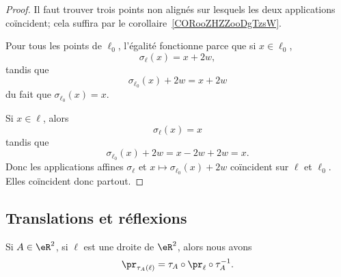 \begin{proof}
    Il faut trouver trois points non alignés sur lesquels les deux applications coïncident; cela suffira par le corollaire~\ref{CORooZHZZooDgTzsW}.

    Pour tous les points de \( \ell_0\), l'égalité fonctionne parce que si \( x\in\ell_0\),
    \begin{equation}
        \sigma_{\ell}(x)=x+2w,
    \end{equation}
    tandis que
    \begin{equation}
        \sigma_{\ell_0}(x)+2w=x+2w
    \end{equation}
    du fait que \( \sigma_{\ell_0}(x)=x\).

    Si \( x\in\ell\), alors
    \begin{equation}
        \sigma_{\ell}(x)=x
    \end{equation}
    tandis que
    \begin{equation}
        \sigma_{\ell_0}(x)+2w=x-2w+2w=x.
    \end{equation}
    Donc les applications affines \( \sigma_{\ell}\) et \( x\mapsto \sigma_{\ell_0}(x)+2w\) coïncident sur \( \ell\) et \( \ell_0\). Elles coïncident donc partout.
\end{proof}

\subsection{Translations et réflexions}

\begin{lemma}       \label{LEMooMKTXooYKZcdQ}
    Si \( A\in \eR^2\), si \( \ell\) est une droite de \( \eR^2\), alors nous avons
    \begin{equation}
        \pr_{\tau_A(\ell)}=\tau_A\circ \pr_{\ell}\circ\tau_A^{-1}.
    \end{equation}
\end{lemma}

